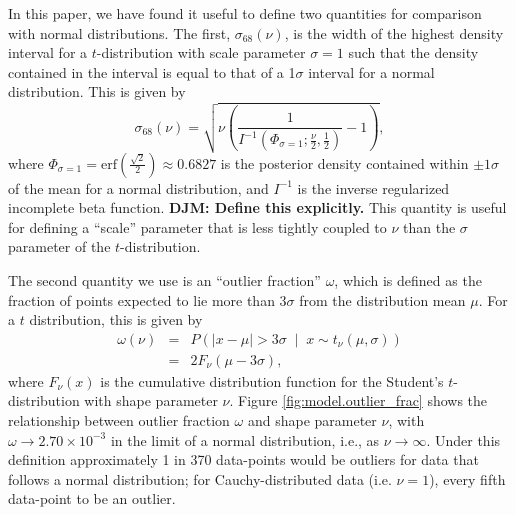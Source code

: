 \documentclass[fleqn,usenatbib]{rasti}
\newcommand{\studentt}[2]{t_\nu \left( #1, #2 \right)}
\begin{document}
In this paper, we have found it useful to define two quantities for comparison
with normal distributions. The first, $\sigma_{68}(\nu)$, is the width of the
highest density interval for a $t$-distribution with scale parameter
$\sigma = 1$ such that the density contained in the interval is equal to that
of a 1$\sigma$ interval for a normal distribution. This is given by
\begin{equation}
    \sigma_{68}(\nu) =
        \sqrt{
            \nu \left(
                \frac{1}{I^{-1}(\Phi_{\sigma=1};\frac\nu2, \frac12)} - 1
            \right)
        },
\end{equation}
where $\Phi_{\sigma=1} = \text{erf}\left(\frac{\sqrt{2}}2\right) \approx 0.6827$
is the posterior density contained within $\pm1\sigma$ of the mean for a normal
distribution, and $I^{-1}$ is the inverse regularized incomplete beta function.
{\color{green} \bf DJM: Define this explicitly.}
This quantity is useful for defining a ``scale'' parameter that is less tightly
coupled to $\nu$ than the $\sigma$ parameter of the $t$-distribution.

The second quantity we use is an ``outlier fraction'' $\omega$, which
is defined as the fraction of points expected to lie more than $3\sigma$ from the
distribution mean $\mu$. For a $t$ distribution, this is given by
\begin{eqnarray}
    \omega(\nu)
    &=& P\left(
        \left|x - \mu \right| > 3 \sigma \;
        \middle| \;
        x \sim \studentt{\mu}{\sigma}
    \right) \label{eqn:model.outlier_frac}\\
    &=& 2 F_\nu \left(\mu - 3 \sigma \right),
\end{eqnarray}
where $F_\nu(x)$ is the cumulative distribution function for the Student's
$t$-distribution with shape parameter $\nu$. Figure \ref{fig:model.outlier_frac}
shows the relationship between outlier fraction $\omega$ and shape parameter
$\nu$, with $\omega \rightarrow 2.70 \times 10^{-3} $ in the limit of a normal
distribution, i.e., as $\nu \rightarrow \infty$.  Under this definition
approximately 1 in 370 data-points would be outliers for data that follows a
normal distribution; for Cauchy-distributed data (i.e. $\nu = 1$), every fifth
data-point to be an outlier.
\end{document}
